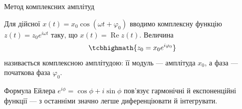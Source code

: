 \documentclass[onlytextwidth]{beamer}
\begin{document}
\begin{frame}{Метод комплексних амплітуд}{}
	\begin{exampleblock}{}\justifying
		Для дійсної $x(t)=x_0\cos(\omega t+\varphi_0)$ вводимо комплексну функцію $z(t)=z_0e^{i\omega t}$ таку, що $x(t)=\operatorname{Re}z(t)$. Величина
		\begin{equation*}
			\tcbhighmath{
				z_0 = x_0e^{i\varphi_0}
			}
		\end{equation*}
		називається \alert{комплексною амплітудою}: її модуль --- амплітуда $x_0$, а фаза --- початкова фаза $\varphi_0$.
	\end{exampleblock}
	\begin{block}{}\justifying\small
		Формула Ейлера $e^{i\phi}=\cos\phi+i\sin\phi$ пов'язує гармонічні й експоненційні функції --- з останніми значно легше диференціювати й інтегрувати.
	\end{block}
\end{frame}
\end{document}

